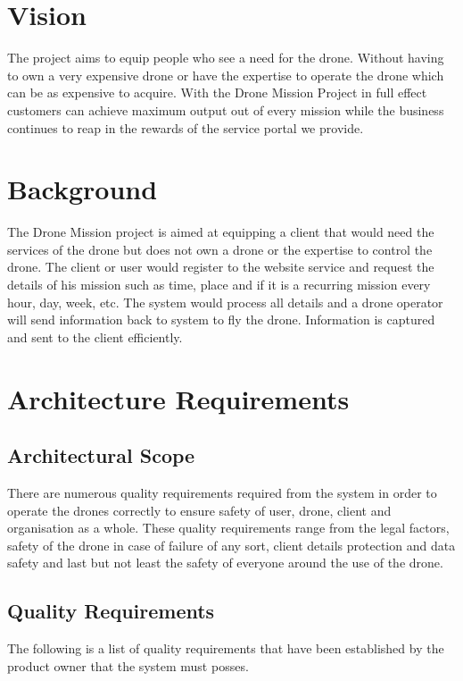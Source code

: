\documentclass{article}
\begin{document}
	\section{Vision}%
	The project aims to equip people who see a need for the drone. Without having to own a very expensive drone or have the expertise to operate the drone which can be as expensive to acquire. With the Drone Mission Project in full effect customers can achieve maximum output out of every mission while the business continues to reap in the rewards of the service portal we provide.
	
	
	\section{Background} %
	The Drone Mission project is aimed at equipping a client that would need the services of the drone but does not own a drone or the expertise to control the drone. The client or user would register to the website service and request the details of his mission such as time, place and if it is a recurring mission every hour, day, week, etc. The system would process all details and a drone operator will send information back to system to fly the drone. Information is captured and sent to the client efficiently.
	\newpage
	
	\section{Architecture Requirements}%
	\subsection{Architectural Scope}%
	There are numerous quality requirements required from the system in order to operate the drones correctly to ensure safety of user, drone, client and organisation as a whole. These quality requirements range from the legal factors, safety of the drone in case of failure of any sort, client details protection and data safety and last but not least the safety of everyone around the use of the drone.
	
	\setlength{\leftskip}{45px}
	\lipsum[2]
	
	\subsection{Quality Requirements}%
	The following is a list of quality requirements that have been established by the product owner that the system must posses.
\end{document}

